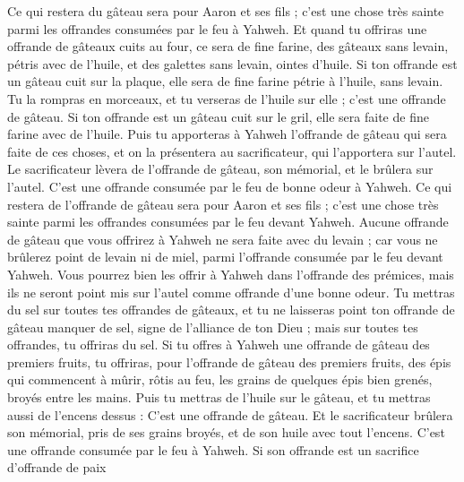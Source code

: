 \begin{multicols}{2}
Ce qui restera du gâteau sera pour Aaron et ses fils ; c'est une chose très sainte parmi les offrandes consumées par le feu à Yahweh.
Et quand tu offriras une offrande de gâteaux cuits au four, ce sera de fine farine, des gâteaux sans levain, pétris avec de l'huile, et des galettes sans levain, ointes d'huile.
Si ton offrande est un gâteau cuit sur la plaque, elle sera de fine farine pétrie à l'huile, sans levain.
Tu la rompras en morceaux, et tu verseras de l'huile sur elle ; c'est une offrande de gâteau.
Si ton offrande est un gâteau cuit sur le gril, elle sera faite de fine farine avec de l'huile.
Puis tu apporteras à Yahweh l'offrande de gâteau qui sera faite de ces choses, et on la présentera au sacrificateur, qui l'apportera sur l'autel.
Le sacrificateur lèvera de l'offrande de gâteau, son mémorial, et le brûlera sur l'autel. C'est une offrande consumée par le feu de bonne odeur à Yahweh.
Ce qui restera de l'offrande de gâteau sera pour Aaron et ses fils ; c'est une chose très sainte parmi les offrandes consumées par le feu devant Yahweh.
Aucune offrande de gâteau que vous offrirez à Yahweh ne sera faite avec du levain ; car vous ne brûlerez point de levain ni de miel, parmi l'offrande consumée par le feu devant Yahweh.
Vous pourrez bien les offrir à Yahweh dans l'offrande des prémices, mais ils ne seront point mis sur l'autel comme offrande d'une bonne odeur.
Tu mettras du sel sur toutes tes offrandes de gâteaux, et tu ne laisseras point ton offrande de gâteau manquer de sel, signe de l'alliance de ton Dieu ; mais sur toutes tes offrandes, tu offriras du sel.
Si tu offres à Yahweh une offrande de gâteau des premiers fruits, tu offriras, pour l'offrande de gâteau des premiers fruits, des épis qui commencent à mûrir, rôtis au feu, les grains de quelques épis bien grenés, broyés entre les mains.
Puis tu mettras de l'huile sur le gâteau, et tu mettras aussi de l'encens dessus : C'est une offrande de gâteau.
Et le sacrificateur brûlera son mémorial, pris de ses grains broyés, et de son huile avec tout l'encens. C'est une offrande consumée par le feu à Yahweh.
\VerseOne{}Si son offrande est un sacrifice d'offrande de paix
\end{multicols}
